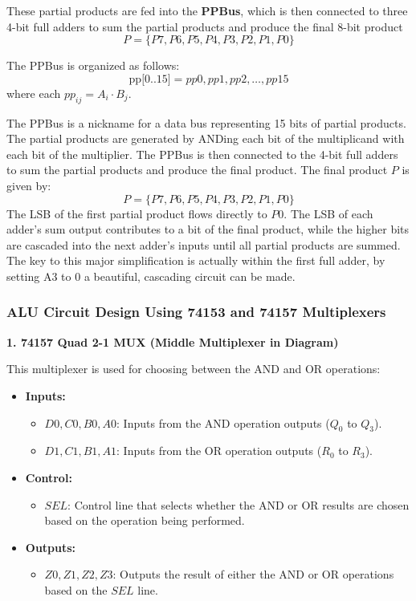 \documentclass[12pt]{article}
\begin{document}
These partial products are fed into the \textbf{PPBus}, which is then connected to three 4-bit full adders to sum the partial products and produce the final 8-bit product
\[
	P = \{P7, P6, P5, P4, P3, P2, P1, P0\}
\]

The PPBus is organized as follows:
\[
	\text{pp[0..15]} =  pp0, pp1, pp2, \dots, pp15
\]
where each \( pp_{ij} = A_i \cdot B_j \).

The PPBus is a nickname for a data bus representing 15 bits of partial products. The partial products are generated by ANDing each bit of the multiplicand with each bit of the multiplier. The PPBus is then connected to the 4-bit full adders to sum the partial products and produce the final product.
The final product \( P \) is given by:
\[
	P = \{ P7, P6, P5, P4, P3, P2, P1, P0 \}
\]
The LSB of the first partial product flows directly to \( P0 \). The LSB of each adder's sum output contributes to a bit of the final product, while the higher bits are cascaded into the next adder’s inputs until all partial products are summed. The key to this major simplification is actually within the first full adder, by setting A3 to \(0\) a beautiful, cascading circuit can be made.
\subsubsection*{ALU Circuit Design Using 74153 and 74157 Multiplexers}
\textbf{1. 74157 Quad 2-1 MUX (Middle Multiplexer in Diagram)}

This multiplexer is used for choosing between the AND and OR operations:
\begin{itemize}
	\item \textbf{Inputs:}
	      \begin{itemize}
		      \item \( D0, C0, B0, A0 \): Inputs from the AND operation outputs (\( Q_0 \) to \( Q_3 \)).
		      \item \( D1, C1, B1, A1 \): Inputs from the OR operation outputs (\( R_0 \) to \( R_3 \)).
	      \end{itemize}
	\item \textbf{Control:}
	      \begin{itemize}
		      \item \( SEL \): Control line that selects whether the AND or OR results are chosen based on the operation being performed.
	      \end{itemize}
	\item \textbf{Outputs:}
	      \begin{itemize}
		      \item \( Z0, Z1, Z2, Z3 \): Outputs the result of either the AND or OR operations based on the \( SEL \) line.
	      \end{itemize}
\end{itemize}
\end{document}
